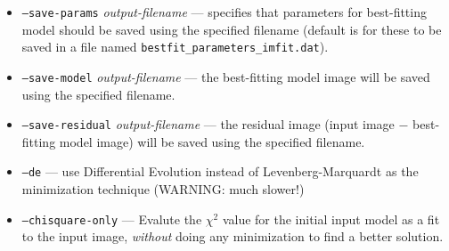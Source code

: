 \documentclass[10pt]{article}
\begin{document}
\begin{itemize}
\bigskip

\item \texttt{--save-params} \textit{output-filename} --- specifies that parameters 
for best-fitting model should be saved using the specified filename (default is
for these to be saved in a file named \texttt{bestfit\_parameters\_imfit.dat}).
\item \texttt{--save-model} \textit{output-filename} --- the best-fitting model image
will be saved using the specified filename.
\item \texttt{--save-residual} \textit{output-filename} --- the residual image (input
image $-$ best-fitting model image) will be saved using the specified filename.

\bigskip
\item \texttt{--de} --- use Differential Evolution instead of Levenberg-Marquardt as
the minimization technique (WARNING: much slower!)
\item \texttt{--chisquare-only} --- Evalute the $\chi^2$ value for the initial input
model as a fit to the input image, \textit{without} doing any minimization to find
a better solution.
\end{itemize}

\end{document}
